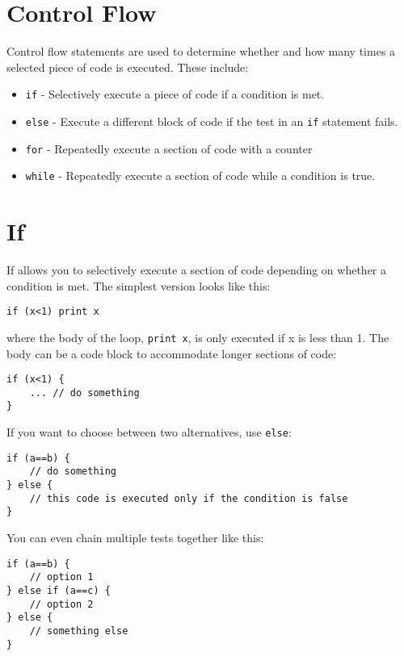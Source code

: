 \hypertarget{control-flow}{%
\section{Control Flow}\label{control-flow}}

Control flow statements are used to determine whether and how many times
a selected piece of code is executed. These include:

\begin{itemize}

\item
  \texttt{if} - Selectively execute a piece of code if a condition is
  met.
\item
  \texttt{else} - Execute a different block of code if the test in an
  \texttt{if} statement fails.
\item
  \texttt{for} - Repeatedly execute a section of code with a counter
\item
  \texttt{while} - Repeatedly execute a section of code while a
  condition is true.
\end{itemize}

\hypertarget{if}{%
\section{If}\label{if}}

If allows you to selectively execute a section of code depending on
whether a condition is met. The simplest version looks like this:

\begin{lstlisting}
if (x<1) print x
\end{lstlisting}

where the body of the loop, \texttt{print\ x}, is only executed if x is
less than 1. The body can be a code block to accommodate longer sections
of code:

\begin{lstlisting}
if (x<1) {
    ... // do something
}
\end{lstlisting}

If you want to choose between two alternatives, use \texttt{else}:

\begin{lstlisting}
if (a==b) {
    // do something
} else {
    // this code is executed only if the condition is false
}
\end{lstlisting}

You can even chain multiple tests together like this:

\begin{lstlisting}
if (a==b) {
    // option 1
} else if (a==c) {
    // option 2
} else {
    // something else
}
\end{lstlisting}

